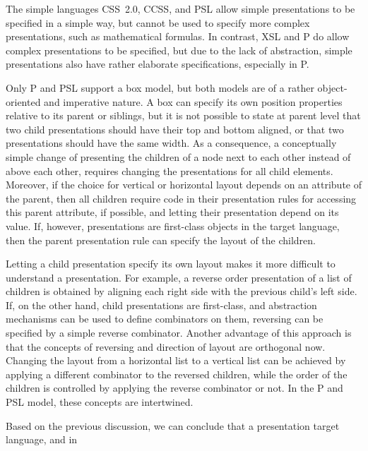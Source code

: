         The simple languages CSS~2.0, CCSS, and PSL allow simple presentations to
        be specified in a simple way, but cannot be used to specify more complex
        presentations, such as mathematical formulas. In contrast, XSL and P do allow
        complex presentations to be specified, but due to the lack of abstraction,
        simple presentations also have rather elaborate specifications, especially in
        P. 
\par Only P and PSL support a box model, but both models are of a rather
        object-oriented and imperative nature. A box can specify its own position
        properties relative to its parent or siblings, but it is not possible to state
        at parent level that two child presentations should have their top and bottom
        aligned, or that two presentations should have the same width. As a
        consequence, a conceptually simple change of presenting the children of a node
        next to each other instead of above each other, requires changing the
        presentations for all child elements. Moreover, if the choice for vertical or
        horizontal layout depends on an attribute of the parent, then all children
        require code in their presentation rules for accessing this parent attribute,
        if possible, and letting their presentation depend on its value. If, however,
        presentations are first-class objects in the target language, then the parent
        presentation rule can specify the layout of the children.
\par Letting a child presentation specify its own layout makes it more
        difficult to understand a presentation. For example, a reverse order
        presentation of a list of children is obtained by aligning each right side with
        the previous child's left side. If, on the other hand, child presentations are
        first-class, and abstraction mechanisms can be used to define combinators on
        them, reversing can be specified by a simple reverse combinator. Another
        advantage of this approach is that the concepts of reversing and direction of
        layout are orthogonal now. Changing the layout from a horizontal list to a
        vertical list can be achieved by applying a different combinator to the
        reversed children, while the order of the children is controlled by applying
        the reverse combinator or not. In the P and PSL model, these concepts are
        intertwined.
\par {} Based on the previous
        discussion, we can conclude that a presentation target language, and in
